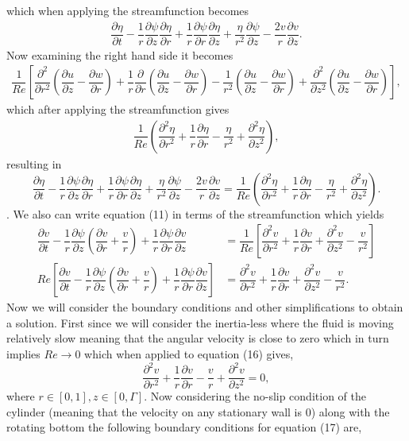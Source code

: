 \documentclass[11pt,letterpaper]{article}
\newcommand{\fdel}[2]{\dfrac{\partial{#1}}{\partial {#2}}} %
\newcommand{\sdel}[2]{\dfrac{\partial^2{#1}}{\partial{#2}^2}} %
\newcommand{\fpar}[1]{\left({#1}\right)} %
\newcommand{\fbrac}[1]{\left[{#1}\right]} %
\begin{document}
which when applying the streamfunction becomes 
\begin{align*}
    \fdel{\eta}{t} -\dfrac{1}{r}\fdel{\psi}{z}\fdel{\eta}{r}+\dfrac{1}{r}\fdel{\psi}{r}\fdel{\eta}{z} +\dfrac{\eta}{r^2}\fdel{\psi}{z}-\dfrac{2v}{r}\fdel{v}{z}.
\end{align*}
Now examining the right hand side it becomes
\begin{align}
    \dfrac{1}{Re}\left[\sdel{}{r}\fpar{\fdel{u}{z} - \fdel{w}{r}}+ \dfrac{1}{r}\fdel{}{r}\fpar{\fdel{u}{z}-\fdel{w}{r}}\right.-\left.\dfrac{1}{r^2}\fpar{\fdel{u}{z}-\fdel{w}{r}} + \sdel{}{z}\fpar{\fdel{u}{z}-\fdel{w}{r} }\right],\nonumber
\end{align}
which after applying the streamfunction gives
\begin{align*}
    \dfrac{1}{Re} \fpar{\sdel{\eta}{r} + \dfrac{1}{r}\fdel{\eta}{r}-\dfrac{\eta}{r^2}+\sdel{\eta}{z}},
\end{align*}
resulting in
\begin{equation}
    \fdel{\eta}{t} -\dfrac{1}{r}\fdel{\psi}{z}\fdel{\eta}{r}+\dfrac{1}{r}\fdel{\psi}{r}\fdel{\eta}{z} +\dfrac{\eta}{r^2}\fdel{\psi}{z}-\dfrac{2v}{r}\fdel{v}{z}=\dfrac{1}{Re} \fpar{\sdel{\eta}{r} + \dfrac{1}{r}\fdel{\eta}{r}-\dfrac{\eta}{r^2}+\sdel{\eta}{z}}.
\end{equation}.
We also can write equation (11) in terms of the streamfunction which yields 
\begin{align}
    \fdel{v}{t} -\dfrac{1}{r}\fdel{\psi}{z}\fpar{\fdel{v}{r}+\dfrac{v}{r}} +\dfrac{1}{r}\fdel{\psi}{r}\fdel{v}{z} &=   \dfrac{1}{Re}\fbrac{{\sdel{v}{r}+\dfrac{1}{r}\fdel{v}{r}+ \sdel{v}{z}-\dfrac{v}{r^2}}}\nonumber\\
    Re\fbrac{\fdel{v}{t} -\dfrac{1}{r}\fdel{\psi}{z}\fpar{\fdel{v}{r}+\dfrac{v}{r}} +\dfrac{1}{r}\fdel{\psi}{r}\fdel{v}{z}} &=   {{\sdel{v}{r}+\dfrac{1}{r}\fdel{v}{r}+ \sdel{v}{z}-\dfrac{v}{r^2}}}.
\end{align}
Now we will consider the boundary conditions and other simplifications to obtain a solution. First since we will consider the inertia-less where the fluid is moving relatively slow meaning that the angular velocity is close to zero which in turn implies $Re\to 0$ which when applied to equation (16) gives,
\begin{equation}
    \sdel{v}{r} + \dfrac{1}{r}\fdel{v}{r} - \frac{v}{r} + \sdel{v}{z} = 0,
\end{equation}
where $r\in\fbrac{0,1}, z\in\fbrac{0,\Gamma}$. Now considering the no-slip condition of the cylinder (meaning that the velocity on any stationary wall is 0) along with the rotating bottom the following boundary conditions for equation (17) are, 
\end{document}
